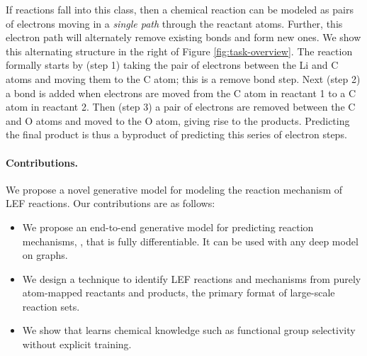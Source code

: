 If reactions fall into this class, then a chemical reaction can be modeled as pairs of electrons moving in a \emph{single path} through the reactant atoms. 
Further, this electron path will alternately remove existing bonds and form new ones. We show this alternating structure in the right of Figure \ref{fig:task-overview}. 
The reaction formally starts by (step 1) taking the pair of electrons between the Li and C atoms and moving them to the C atom; this is a remove bond step. 
Next (step 2) a bond is added when electrons are moved from the C atom in reactant 1 to a C atom in reactant 2.
Then (step 3) a pair of electrons are removed between the C and O atoms and moved to the O atom, giving rise to the products. 
Predicting the final product is thus a byproduct of predicting this series of electron steps.


\paragraph{Contributions.} We propose a novel generative model for modeling the reaction mechanism of LEF reactions. Our contributions are as follows:
\begin{itemize}
\item We propose an end-to-end generative model for predicting reaction mechanisms, \ourModelR, that is fully differentiable. It can be used with any deep model on graphs.
\item We design a technique to identify LEF reactions and mechanisms from purely atom-mapped reactants and products, the primary format of large-scale reaction sets.
\item We show that \ourModelR learns chemical knowledge such as functional group selectivity without explicit training.
\end{itemize}


